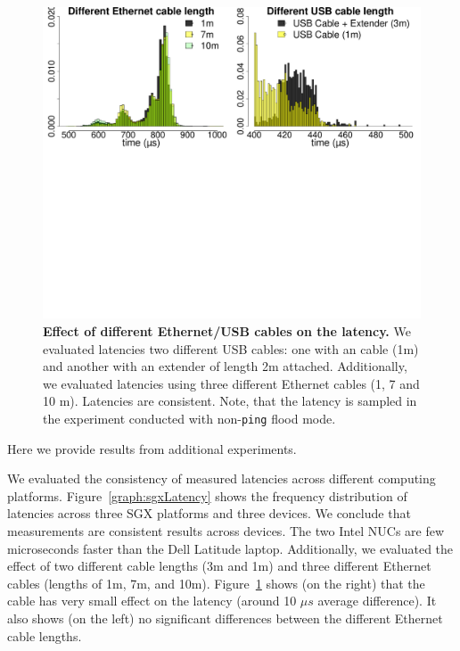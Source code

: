\begin{figure}[t]
  \centering
    \includegraphics[trim={0 18cm 0 0}, clip, width=\linewidth]{chapters/ProximiTEE/data/graph/CombinedCable_1.pdf}
    \caption[Effect of Different Ethernet/USB cables on the latency]{\textbf{Effect of different Ethernet/USB cables on the latency.} We evaluated latencies two different USB cables: one with an \usb cable (1m) and another with an \usb extender of length 2m attached. Additionally, we evaluated latencies using three different Ethernet cables (1, 7 and 10 m). Latencies are consistent. Note, that the latency is sampled in the experiment conducted with non-\texttt{ping} flood mode.}
    \label{graph:usbCableLength}
\end{figure}


Here we provide results from additional experiments.

We evaluated the consistency of measured latencies across different computing platforms. Figure~\ref{graph:sgxLatency} shows the frequency distribution of latencies across three SGX platforms and three \device devices. We conclude that measurements are consistent results across devices. The two Intel NUCs are few microseconds faster than the Dell Latitude laptop. Additionally, we evaluated the effect of two different \usb cable lengths (3m and 1m) and three different Ethernet cables (lengths of 1m, 7m, and 10m). Figure~\ref{graph:usbCableLength} shows (on the right) that the \usb cable has very small effect on the latency (around 10 $\mu s$ average difference). It also shows (on the left) no significant differences between the different Ethernet cable lengths. 


